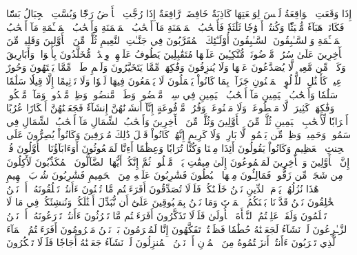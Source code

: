 إِذَا وَقَعَتِ ٱلۡوَاقِعَةُ
لَيۡسَ لِوَقۡعَتِهَا كَاذِبَةٌ
خَافِضَةٞ رَّافِعَةٌ
إِذَا رُجَّتِ ٱلۡأَرۡضُ رَجّٗا
وَبُسَّتِ ٱلۡجِبَالُ بَسّٗا
فَكَانَتۡ هَبَآءٗ مُّنۢبَثّٗا
وَكُنتُمۡ أَزۡوَٰجٗا ثَلَٰثَةٗ
فَأَصۡحَٰبُ ٱلۡمَيۡمَنَةِ مَآ أَصۡحَٰبُ ٱلۡمَيۡمَنَةِ
وَأَصۡحَٰبُ ٱلۡمَشۡـَٔمَةِ مَآ أَصۡحَٰبُ ٱلۡمَشۡـَٔمَةِ
وَٱلسَّـٰبِقُونَ ٱلسَّـٰبِقُونَ
أُوْلَـٰٓئِكَ ٱلۡمُقَرَّبُونَ
فِي جَنَّـٰتِ ٱلنَّعِيمِ
ثُلَّةٞ مِّنَ ٱلۡأَوَّلِينَ
وَقَلِيلٞ مِّنَ ٱلۡأٓخِرِينَ
عَلَىٰ سُرُرٖ مَّوۡضُونَةٖ
مُّتَّكِـِٔينَ عَلَيۡهَا مُتَقَٰبِلِينَ
يَطُوفُ عَلَيۡهِمۡ وِلۡدَٰنٞ مُّخَلَّدُونَ
بِأَكۡوَابٖ وَأَبَارِيقَ وَكَأۡسٖ مِّن مَّعِينٖ
لَّا يُصَدَّعُونَ عَنۡهَا وَلَا يُنزِفُونَ
وَفَٰكِهَةٖ مِّمَّا يَتَخَيَّرُونَ
وَلَحۡمِ طَيۡرٖ مِّمَّا يَشۡتَهُونَ
وَحُورٌ عِينٞ
كَأَمۡثَٰلِ ٱللُّؤۡلُوِٕ ٱلۡمَكۡنُونِ
جَزَآءَۢ بِمَا كَانُواْ يَعۡمَلُونَ
لَا يَسۡمَعُونَ فِيهَا لَغۡوٗا وَلَا تَأۡثِيمًا
إِلَّا قِيلٗا سَلَٰمٗا سَلَٰمٗا
وَأَصۡحَٰبُ ٱلۡيَمِينِ مَآ أَصۡحَٰبُ ٱلۡيَمِينِ
فِي سِدۡرٖ مَّخۡضُودٖ
وَطَلۡحٖ مَّنضُودٖ
وَظِلّٖ مَّمۡدُودٖ
وَمَآءٖ مَّسۡكُوبٖ
وَفَٰكِهَةٖ كَثِيرَةٖ
لَّا مَقۡطُوعَةٖ وَلَا مَمۡنُوعَةٖ
وَفُرُشٖ مَّرۡفُوعَةٍ
إِنَّآ أَنشَأۡنَٰهُنَّ إِنشَآءٗ
فَجَعَلۡنَٰهُنَّ أَبۡكَارًا
عُرُبًا أَتۡرَابٗا
لِّأَصۡحَٰبِ ٱلۡيَمِينِ
ثُلَّةٞ مِّنَ ٱلۡأَوَّلِينَ
وَثُلَّةٞ مِّنَ ٱلۡأٓخِرِينَ
وَأَصۡحَٰبُ ٱلشِّمَالِ مَآ أَصۡحَٰبُ ٱلشِّمَالِ
فِي سَمُومٖ وَحَمِيمٖ
وَظِلّٖ مِّن يَحۡمُومٖ
لَّا بَارِدٖ وَلَا كَرِيمٍ
إِنَّهُمۡ كَانُواْ قَبۡلَ ذَٰلِكَ مُتۡرَفِينَ
وَكَانُواْ يُصِرُّونَ عَلَى ٱلۡحِنثِ ٱلۡعَظِيمِ
وَكَانُواْ يَقُولُونَ أَئِذَا مِتۡنَا وَكُنَّا تُرَابٗا وَعِظَٰمًا أَءِنَّا لَمَبۡعُوثُونَ
أَوَءَابَآؤُنَا ٱلۡأَوَّلُونَ
قُلۡ إِنَّ ٱلۡأَوَّلِينَ وَٱلۡأٓخِرِينَ
لَمَجۡمُوعُونَ إِلَىٰ مِيقَٰتِ يَوۡمٖ مَّعۡلُومٖ
ثُمَّ إِنَّكُمۡ أَيُّهَا ٱلضَّآلُّونَ ٱلۡمُكَذِّبُونَ
لَأٓكِلُونَ مِن شَجَرٖ مِّن زَقُّومٖ
فَمَالِـُٔونَ مِنۡهَا ٱلۡبُطُونَ
فَشَٰرِبُونَ عَلَيۡهِ مِنَ ٱلۡحَمِيمِ
فَشَٰرِبُونَ شُرۡبَ ٱلۡهِيمِ
هَٰذَا نُزُلُهُمۡ يَوۡمَ ٱلدِّينِ
نَحۡنُ خَلَقۡنَٰكُمۡ فَلَوۡلَا تُصَدِّقُونَ
أَفَرَءَيۡتُم مَّا تُمۡنُونَ
ءَأَنتُمۡ تَخۡلُقُونَهُۥٓ أَمۡ نَحۡنُ ٱلۡخَٰلِقُونَ
نَحۡنُ قَدَّرۡنَا بَيۡنَكُمُ ٱلۡمَوۡتَ وَمَا نَحۡنُ بِمَسۡبُوقِينَ
عَلَىٰٓ أَن نُّبَدِّلَ أَمۡثَٰلَكُمۡ وَنُنشِئَكُمۡ فِي مَا لَا تَعۡلَمُونَ
وَلَقَدۡ عَلِمۡتُمُ ٱلنَّشۡأَةَ ٱلۡأُولَىٰ فَلَوۡلَا تَذَكَّرُونَ
أَفَرَءَيۡتُم مَّا تَحۡرُثُونَ
ءَأَنتُمۡ تَزۡرَعُونَهُۥٓ أَمۡ نَحۡنُ ٱلزَّـٰرِعُونَ
لَوۡ نَشَآءُ لَجَعَلۡنَٰهُ حُطَٰمٗا فَظَلۡتُمۡ تَفَكَّهُونَ
إِنَّا لَمُغۡرَمُونَ
بَلۡ نَحۡنُ مَحۡرُومُونَ
أَفَرَءَيۡتُمُ ٱلۡمَآءَ ٱلَّذِي تَشۡرَبُونَ
ءَأَنتُمۡ أَنزَلۡتُمُوهُ مِنَ ٱلۡمُزۡنِ أَمۡ نَحۡنُ ٱلۡمُنزِلُونَ
لَوۡ نَشَآءُ جَعَلۡنَٰهُ أُجَاجٗا فَلَوۡلَا تَشۡكُرُونَ
